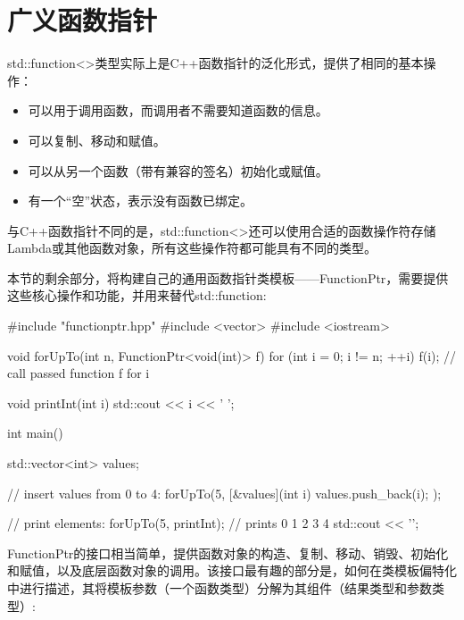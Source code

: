 \section{广义函数指针}
std::function<>类型实际上是C++函数指针的泛化形式，提供了相同的基本操作：

\begin{itemize}
\item 
可以用于调用函数，而调用者不需要知道函数的信息。

\item 
可以复制、移动和赋值。

\item 
可以从另一个函数（带有兼容的签名）初始化或赋值。

\item 
有一个“空”状态，表示没有函数已绑定。
\end{itemize}

与C++函数指针不同的是，std::function<>还可以使用合适的函数操作符存储Lambda或其他函数对象，所有这些操作符都可能具有不同的类型。

本节的剩余部分，将构建自己的通用函数指针类模板——FunctionPtr，需要提供这些核心操作和功能，并用来替代std::function:

\begin{cpp}
#include "functionptr.hpp"
#include <vector>
#include <iostream>

void forUpTo(int n, FunctionPtr<void(int)> f) {
	for (int i = 0; i != n; ++i)
	{
		f(i); // call passed function f for i
	}
}

void printInt(int i) {
	std::cout << i << ' ';
}

int main() {
	std::vector<int> values;
	
	// insert values from 0 to 4:
	forUpTo(5,
			[&values](int i) {
				values.push_back(i);
			});
		
	// print elements:
	forUpTo(5,
			printInt); // prints 0 1 2 3 4
	std::cout << '\n';
}
\end{cpp}

FunctionPtr的接口相当简单，提供函数对象的构造、复制、移动、销毁、初始化和赋值，以及底层函数对象的调用。该接口最有趣的部分是，如何在类模板偏特化中进行描述，其将模板参数（一个函数类型）分解为其组件（结果类型和参数类型）:

